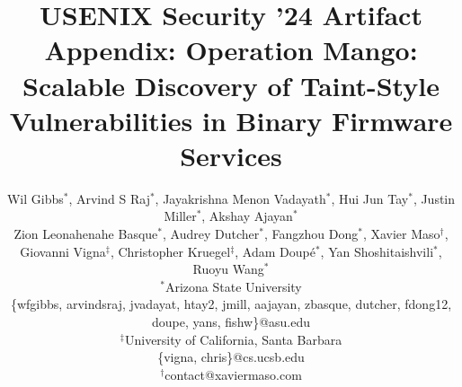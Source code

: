 \newcommand{\mango}{Mango\xspace}
\newcommand{\asu}{Arizona State University}
\newcommand{\ucsb}{University of California, Santa Barbara}

\newcommand{\rda}{\textsc{MangoDFA}\xspace}

%
%
%
%
\usepackage[available,functional,reproduced]{usenixbadges}




\date{}

\title{USENIX Security '24 Artifact Appendix: Operation \mango: Scalable Discovery of Taint-Style Vulnerabilities in Binary Firmware Services}

\author{
    {\rm Wil Gibbs$^\ast$, 
    Arvind S Raj$^\ast$, 
    Jayakrishna Menon Vadayath$^\ast$, 
    Hui Jun Tay$^\ast$, 
    Justin Miller$^\ast$,
    Akshay Ajayan$^\ast$
    }\\
    {\rm
    Zion Leonahenahe Basque$^\ast$,
    Audrey Dutcher$^\ast$, 
    Fangzhou Dong$^\ast$,
    Xavier Maso$^\dagger$,
    }\\
    {\rm
    Giovanni Vigna$^\ddagger$, 
    Christopher Kruegel$^\ddagger$,
    Adam Doupé$^\ast$, 
    Yan Shoshitaishvili$^\ast$, 
    Ruoyu Wang$^\ast$
    }
    \vspace{0.5em}
    \\
    $^\ast$\asu\\
     \{wfgibbs, arvindsraj, jvadayat, htay2, jmill, aajayan, zbasque, dutcher, fdong12, doupe, yans, fishw\}@asu.edu\\
    $^\ddag$\ucsb\\
     \{vigna, chris\}@cs.ucsb.edu\\
    $^\dagger$contact@xaviermaso.com
}

\maketitle





